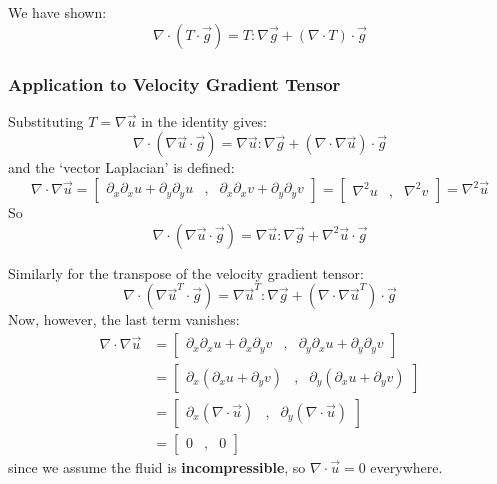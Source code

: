 \documentclass[a4paper]{report}
\begin{document}
We have shown:
\begin{equation*}
\nabla \cdot (T \cdot \vec{g}) =  T:\nabla \vec{g} + (\nabla \cdot T) \cdot \vec{g}
\end{equation*}


\subsubsection*{Application to Velocity Gradient Tensor}

Substituting $T = \nabla \vec{u}$ in the identity gives:
\begin{equation*}
\nabla \cdot (\nabla \vec{u} \cdot \vec{g}) = 
\nabla \vec{u}:\nabla \vec{g} + (\nabla \cdot \nabla \vec{u}) \cdot \vec{g}
\end{equation*}
and the `vector Laplacian' is defined:
\begin{equation*}
\nabla \cdot \nabla \vec{u} =
\begin{bmatrix}
\partial_x \partial_x u + \partial_y \partial_y u &,& \partial_x \partial_x v + \partial_y \partial_y v
\end{bmatrix} =
\begin{bmatrix}
\nabla^2 u &,& \nabla^2 v
\end{bmatrix}
= \nabla^2 \vec{u}
\end{equation*}
So
\begin{equation*}
\nabla \cdot (\nabla \vec{u} \cdot \vec{g}) = 
\nabla \vec{u}:\nabla \vec{g} + \nabla^2 \vec{u} \cdot \vec{g}
\end{equation*}

Similarly for the transpose of the velocity gradient tensor:
\begin{equation*}
\nabla \cdot (\nabla \vec{u}^T \cdot \vec{g}) = 
\nabla \vec{u}^T:\nabla \vec{g} + (\nabla \cdot \nabla \vec{u}^T) \cdot \vec{g}
\end{equation*}
Now, however, the last term vanishes:
\begin{align*}
\nabla \cdot \nabla \vec{u} & =
\begin{bmatrix}
\partial_x \partial_x u + \partial_x \partial_y v &,&
 \partial_y \partial_x u + \partial_y \partial_y v
\end{bmatrix} \\
 & =
\begin{bmatrix}
\partial_x ( \partial_x u + \partial_y v ) &,&
\partial_y ( \partial_x u + \partial_y v )
\end{bmatrix} \\
 & = 
\begin{bmatrix}
\partial_x ( \nabla \cdot \vec{u}) &,&
\partial_y ( \nabla \cdot \vec{u})
\end{bmatrix} \\
 & = 
 \begin{bmatrix}
 0 &,& 0
 \end{bmatrix}
\end{align*}
since we assume the fluid is \textbf{incompressible}, so $\nabla \cdot \vec{u} = 0$ everywhere.
\end{document}

